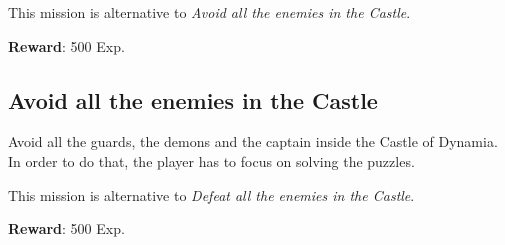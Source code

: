 This mission is alternative to \textit{Avoid all the enemies in the Castle}.

\textbf{Reward}: 500 Exp.

\subsection{Avoid all the enemies in the Castle}
Avoid all the guards, the demons and the captain inside the Castle of Dynamia. In order to do that, the player has to focus on solving the puzzles.

This mission is alternative to \textit{Defeat all the enemies in the Castle}.

\textbf{Reward}: 500 Exp.


%
%
%
